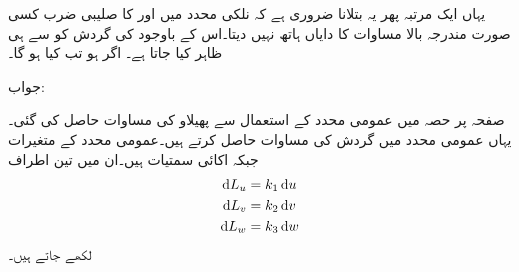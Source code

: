 یہاں ایک مرتبہ پھر یہ بتلانا ضروری ہے کہ نلکی محدد میں  اور  کا صلیبی ضرب کسی صورت مندرجہ بالا مساوات کا دایاں ہاتھ نہیں دیتا۔اس کے باوجود  کی  گردش کو  سے ہی ظاہر کیا جاتا ہے۔ 
اگر  ہو تب  کیا ہو گا۔

جواب:

صفحہ  پر حصہ  میں عمومی محدد کے استعمال سے پھیلاو کی مساوات حاصل کی گئی۔یہاں عمومی محدد میں گردش کی مساوات حاصل کرتے ہیں۔عمومی محدد کے متغیرات  جبکہ اکائی سمتیات  ہیں۔ان میں تین اطراف
\begin{align*}
\dif L_u &= k_1 \dif u \\
\dif L_v &= k_2 \dif v \\
\dif L_w &= k_3 \dif w 
\end{align*}
لکھے جاتے ہیں۔

